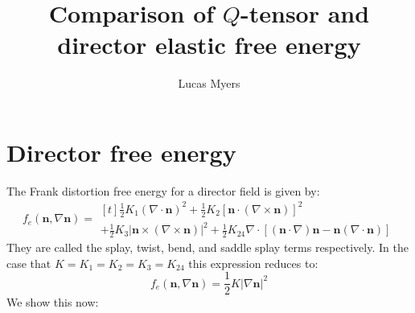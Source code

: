\documentclass[reqno]{article}
\begin{document}
\title{Comparison of $Q$-tensor and director elastic free energy}
\author{Lucas Myers}
\maketitle

\section{Director free energy}
The Frank distortion free energy for a director field is given by:
\begin{equation}
    f_e(\mathbf{n}, \nabla \mathbf{n})
    =
    \begin{multlined}[t]
    \frac12 K_1 (\nabla \cdot \mathbf{n})^2
    + \frac12 K_2 \left[ \mathbf{n} \cdot (\nabla \times \mathbf{n}) \right]^2 \\
    + \frac12 K_3 \left| \mathbf{n} \times (\nabla \times \mathbf{n}) \right|^2
    + \frac12 K_{24} \nabla \cdot \left[(\mathbf{n} \cdot \nabla) \mathbf{n} - \mathbf{n} (\nabla \cdot \mathbf{n})\right]
    \end{multlined}
\end{equation}
They are called the splay, twist, bend, and saddle splay terms respectively.
In the case that $K = K_1 = K_2 = K_3 = K_{24}$ this expression reduces to:
\begin{equation}
    f_e(\mathbf{n}, \nabla \mathbf{n})
    =
    \frac12 K \left| \nabla \mathbf{n} \right|^2
\end{equation}
We show this now:
\end{document}
